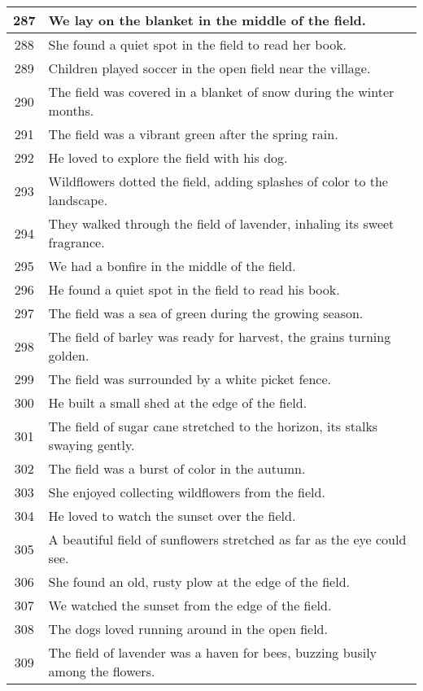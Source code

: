 \begin{longtable}{|c|p{12cm}|}
287 & We lay on the blanket in the middle of the field. \\ \hline
288 & She found a quiet spot in the field to read her book. \\ \hline
289 & Children played soccer in the open field near the village. \\ \hline
290 & The field was covered in a blanket of snow during the winter months. \\ \hline
291 & The field was a vibrant green after the spring rain. \\ \hline
292 & He loved to explore the field with his dog. \\ \hline
293 & Wildflowers dotted the field, adding splashes of color to the landscape. \\ \hline
294 & They walked through the field of lavender, inhaling its sweet fragrance. \\ \hline
295 & We had a bonfire in the middle of the field. \\ \hline
296 & He found a quiet spot in the field to read his book. \\ \hline
297 & The field was a sea of green during the growing season. \\ \hline
298 & The field of barley was ready for harvest, the grains turning golden. \\ \hline
299 & The field was surrounded by a white picket fence. \\ \hline
300 & He built a small shed at the edge of the field. \\ \hline
301 & The field of sugar cane stretched to the horizon, its stalks swaying gently. \\ \hline
302 & The field was a burst of color in the autumn. \\ \hline
303 & She enjoyed collecting wildflowers from the field. \\ \hline
304 & He loved to watch the sunset over the field. \\ \hline
305 & A beautiful field of sunflowers stretched as far as the eye could see. \\ \hline
306 & She found an old, rusty plow at the edge of the field. \\ \hline
307 & We watched the sunset from the edge of the field. \\ \hline
308 & The dogs loved running around in the open field. \\ \hline
309 & The field of lavender was a haven for bees, buzzing busily among the flowers. \\ \hline

\end{longtable}
